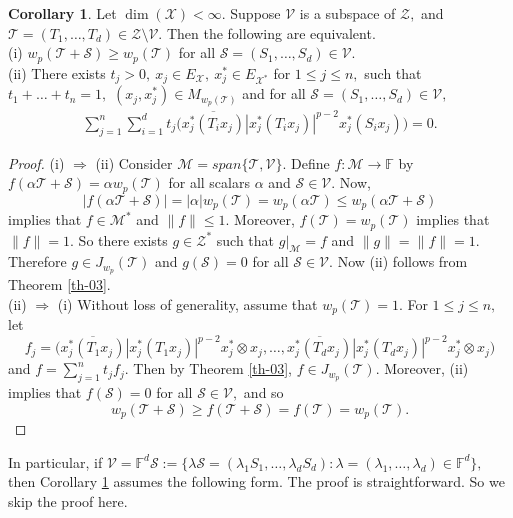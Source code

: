 \documentclass{amsart}
\theoremstyle{definition}
\newtheorem{cor}[theorem]{Corollary}
\theoremstyle{remark}
\numberwithin{equation}{section}
\begin{document}
\begin{cor}\label{cor-05}
	Let $\dim(\mathcal{X})<\infty.$ Suppose  $\mathcal{V}$ is a subspace  of $\mathcal{Z},$ and $\mathcal{T}=(T_1,\ldots,T_d)\in \mathcal{Z}\setminus \mathcal{V}.$ Then the following are equivalent.\\
	\rm(i) $w_p(\mathcal{T}+\mathcal{S})\geq w_p(\mathcal{T})$  for all $\mathcal{S}=(S_1,\ldots,S_d)\in \mathcal{V}.$ \\
	\rm(ii) There exists $t_j>0, ~x_j\in E_{\mathcal{X}},~x_j^*\in E_{\mathcal{X}^*}$ for $1\leq j\leq n,$ such that  $t_1+\ldots+t_n=1,$ $(x_j,x_j^*)\in M_{w_p(\mathcal{T})}$ and  for all $\mathcal{S}=(S_1,\ldots,S_d)\in \mathcal{V},$
	\begin{eqnarray*}
	\sum_{j=1}^n\sum_{i=1}^dt_j\bigg(\overline{x_j^*(T_ix_j)}|x_j^*(T_ix_j)|^{p-2}x_j^*(S_ix_j) \bigg)=0.
	\end{eqnarray*}
\end{cor}
\begin{proof}
(i) $\Rightarrow$ (ii) Consider $\mathcal{M}=span\{\mathcal{T},\mathcal{V}\}.$ Define $f:\mathcal{M}\to \mathbb{F}$ by $f(\alpha \mathcal{T}+\mathcal{S})=\alpha w_p(\mathcal{T})$ for all scalars $\alpha$ and $\mathcal{S}\in \mathcal{V}.$	Now, 
\[|f(\alpha \mathcal{T}+\mathcal{S})|=|\alpha| w_p(\mathcal{T})=w_p(\alpha \mathcal{T})\leq w_p(\alpha \mathcal{T}+\mathcal{S})\] implies that $f\in \mathcal{M}^*$ and $\|f\|\leq 1.$ Moreover, $f(\mathcal{T})=w_p(\mathcal{T})$ implies that $\|f\|=1.$ So there exists $g\in \mathcal{Z}^*$ such that $g|_\mathcal{M}=f$ and $\|g\|=\|f\|=1.$ Therefore $g\in J_{w_p}(\mathcal{T})$ and $g(\mathcal{S})=0$ for all $\mathcal{S}\in \mathcal{V}.$ Now (ii) follows from Theorem \ref{th-03}.\\

(ii) $\Rightarrow $ (i) Without loss of generality, assume that $w_p(\mathcal{T})=1.$ For $1\leq j\leq n,$ let
\[f_j=\bigg(\overline{x_j^*(T_1x_j)}|x_j^*(T_1x_j)|^{p-2}x_j^*\otimes x_j,\ldots,\overline{x_j^*(T_dx_j)}|x_j^*(T_dx_j)|^{p-2}x_j^*\otimes x_j\bigg)\]
and $f=\sum_{j=1}^nt_jf_j.$ Then by Theorem \ref{th-03}, $f\in J_{w_p}(\mathcal{T}).$ Moreover, (ii) implies that $f(\mathcal{S})=0$ for all $\mathcal{S}\in \mathcal{V},$ and so
\[w_p(\mathcal{T}+\mathcal{S})\geq f(\mathcal{T}+\mathcal{S})=f(\mathcal{T})=w_p(\mathcal{T}).\]
\end{proof}

In particular, if $\mathcal{V}=\mathbb{F}^d\mathcal{S}:=\{\lambda \mathcal{S}=(\lambda_1S_1,\ldots, \lambda_dS_d):\lambda=(\lambda_1,\ldots,\lambda_d)\in \mathbb{F}^d\},$ then Corollary \ref{cor-05} assumes the following form. The proof is straightforward. So we skip the proof here. 
\end{document}

